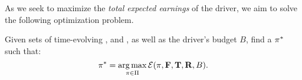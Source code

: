 As we seek to maximize the \emph{total expected earnings} of the driver,
we aim to solve the following optimization problem.
\begin{problem}[{\originalproblem}]\label{problem:theproblem}
Given sets of time-evolving {\empiricaltransitionmatrix}, {\traveltimematrix} and {\rewardsmatrix}, as well as the driver's budget $B$,
find a $\pi^\ast$
such that:
\[
\pi^\ast = \operatorname*{arg\,max}_{\pi\in \Pi}\mathcal{E}(\pi,{\mathbf{F}},{\mathbf{T}},{\mathbf{R}},B).
\]
\end{problem}

